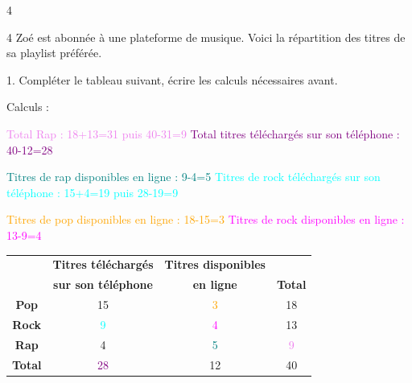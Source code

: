 \documentclass[a4paper]{book}
\begin{document}
{\begin{exerciceNote}{4}
\begin{minipage}{0.49\linewidth}
            \begin{center}
            \end{center}
        
        \end{minipage}
    \end{exerciceNote}


    \begin{exerciceNote}{4}
        Zoé est abonnée à une plateforme de musique. Voici la répartition des titres de sa playlist préférée.

        1. Compléter le tableau suivant, écrire les calculs nécessaires avant.

        \medskip
    
        Calculs : 

        \textcolor{violet}{Total Rap : 18+13=31 puis 40-31=9} \quad \textcolor{purple}{Total titres téléchargés sur son téléphone : 40-12=28}

        \textcolor{teal}{Titres de rap disponibles en ligne : 9-4=5} \quad \textcolor{cyan}{Titres de rock téléchargés sur son téléphone : 15+4=19 puis 28-19=9}

        \textcolor{orange}{Titres de pop disponibles en ligne : 18-15=3} \quad \textcolor{magenta}{Titres de rock disponibles en ligne : 13-9=4}
        
        \begin{center}
            \begin{tabular}{|c|c|c|c|}
                \hline
                 & \textbf{Titres téléchargés} & \textbf{Titres disponibles} & \\
                 & \textbf{sur son téléphone} & \textbf{en ligne} & \textbf{Total} \\
                \hline
                \textbf{Pop} & 15 & \textcolor{orange}{3} & 18 \\
                \hline
                \textbf{Rock} & \textcolor{cyan}{9} & \textcolor{magenta}{4} & 13 \\
                \hline
                \textbf{Rap} & 4 & \textcolor{teal}{5} & \textcolor{violet}{9}\\
                \hline
                \textbf{Total} & \textcolor{purple}{28} & 12 & 40 \\
                \hline
            \end{tabular}
        \end{center}


\end{exerciceNote}}
\end{document}
